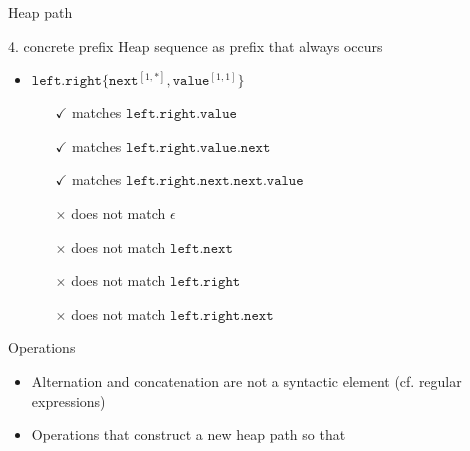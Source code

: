 \documentclass{beamer}
\begin{document}
\begin{frame}{Heap path}
\begin{block}{4. concrete prefix}
Heap sequence as prefix that always occurs
\begin{itemize}
    \item $\mathtt{left.right} \{ \mathtt{next}^{[1,*]}, \mathtt{value}^{[1,1]} \}$
    \begin{itemize}
    \item[$\checkmark$] matches $\mathtt{left.right.value}$
    \item[$\checkmark$] matches $\mathtt{left.right.value.next}$
    \item[$\checkmark$] matches $\mathtt{left.right.next.next.value}$
    \item[$\times$] does not match $\epsilon$
    \item[$\times$] does not match $\mathtt{left.next}$
    \item[$\times$] does not match $\mathtt{left.right}$
    \item[$\times$] does not match $\mathtt{left.right.next}$
    \end{itemize}
\end{itemize}
\end{block}
\end{frame}
\begin{frame}{Operations}
\begin{itemize}
    \item Alternation and concatenation are not a syntactic element (cf. regular expressions)
    \item Operations that construct a new heap path so that
\end{itemize}
\end{frame}
\end{document}

